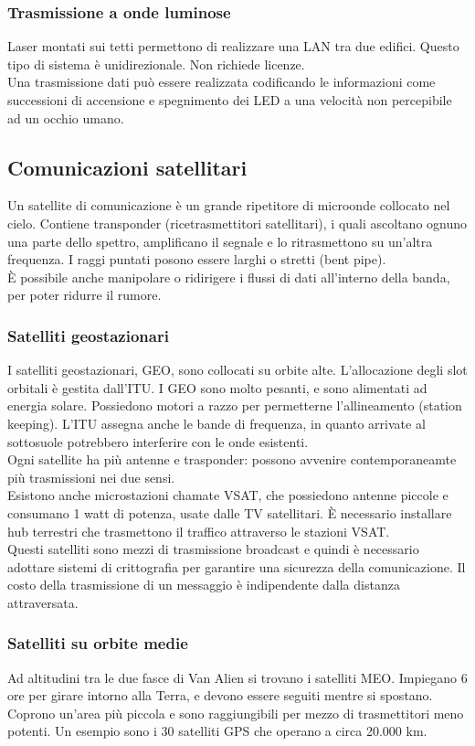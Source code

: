 \documentclass{article}
\begin{document}
		\subsubsection{Trasmissione a onde luminose}
		Laser montati sui tetti permettono di realizzare una LAN tra due edifici. Questo tipo di sistema è unidirezionale. Non richiede licenze. \\
		Una trasmissione dati può essere realizzata codificando le informazioni come successioni di accensione e spegnimento dei LED a una velocità non percepibile ad un occhio umano. 
		\subsection{Comunicazioni satellitari}
		Un satellite di comunicazione è un grande ripetitore di microonde collocato nel cielo. Contiene transponder (ricetrasmettitori satellitari), i quali ascoltano ognuno una parte dello spettro, amplificano il segnale e lo ritrasmettono su un'altra frequenza. I raggi puntati posono essere larghi o stretti (bent pipe).\\
		È possibile anche manipolare o ridirigere i flussi di dati all'interno della banda, per poter ridurre il rumore. 
		\subsubsection{Satelliti geostazionari}
		I satelliti geostazionari, GEO, sono collocati su orbite alte. L'allocazione degli slot orbitali è gestita dall'ITU. I GEO sono molto pesanti, e sono alimentati ad energia solare. Possiedono motori a razzo per permetterne l'allineamento (station keeping). L'ITU assegna anche le bande di frequenza, in quanto arrivate al sottosuole potrebbero interferire con le onde esistenti. \\
		Ogni satellite ha più antenne e trasponder: possono avvenire contemporaneamte più trasmissioni nei due sensi. \\
		Esistono anche microstazioni chamate VSAT, che possiedono antenne piccole e consumano 1 watt di potenza, usate dalle TV satellitari. È necessario installare hub terrestri che trasmettono il traffico attraverso le stazioni VSAT. \\
		Questi satelliti sono mezzi di trasmissione broadcast e quindi è necessario adottare sistemi di crittografia per garantire una sicurezza della comunicazione. Il costo della trasmissione di un messaggio è indipendente dalla distanza attraversata.
		\subsubsection{Satelliti su orbite medie}
		Ad altitudini tra le due fasce di Van Alien si trovano i satelliti MEO. Impiegano 6 ore per girare intorno alla Terra, e devono essere seguiti mentre si spostano. Coprono un'area più piccola e sono raggiungibili per mezzo di trasmettitori meno potenti. Un esempio sono i 30 satelliti GPS che operano a circa 20.000 km.
\end{document}
